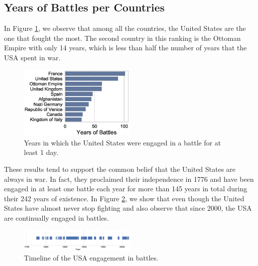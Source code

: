 \subsection{Years of Battles per Countries}
In Figure \ref{fig:FightingDurationRanking}, we observe that among all the countries, the United States are the one that fought the most. The second country in this ranking is the Ottoman Empire with only 14 years, which is less than half the number of years that the USA spent in war.
 \begin{figure}[h]
	\centering	\includegraphics[width=0.5\textwidth]{figures/YearsFightingRanking}
	\caption{Years in which the United States were engaged in a battle for at least 1 day.}\label{fig:FightingDurationRanking}
	\centering
\end{figure}

These results tend to support the common belief that the United States are always in war. In fact, they proclaimed their independence in 1776 and have been engaged in at least one battle each year for more than 145 years in total during their 242 years of existence. In Figure \ref{fig:USAFightingTimeline}, we show that even though the United States have almost never stop fighting and also observe that since 2000, the USA are continually engaged in battles.
 
 \begin{figure}[h]
 	\centering	\includegraphics[width=0.5\textwidth]{figures/USAFighting}
 	\caption{Timeline of the USA engagement in battles.}\label{fig:USAFightingTimeline}
 	\centering
 \end{figure}

 